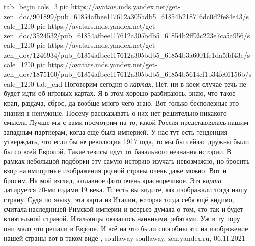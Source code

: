 
\ifcmt
  tab_begin cols=3
     pic https://avatars.mds.yandex.net/get-zen_doc/901899/pub_61854afbee117612a305bdb5_61854b218716dc0d2fe84e43/scale_1200
     pic https://avatars.mds.yandex.net/get-zen_doc/3524532/pub_61854afbee117612a305bdb5_61854b2ff93c223e7ca5a956/scale_1200
		 pic https://avatars.mds.yandex.net/get-zen_doc/1246934/pub_61854afbee117612a305bdb5_61854b3a6001fe1da5fbf43e/scale_1200
		 pic https://avatars.mds.yandex.net/get-zen_doc/1875160/pub_61854afbee117612a305bdb5_61854b5614cf1b34fe06156b/scale_1200
  tab_end
\fi
Поговорим сегодня о \emph{картах}. Нет, ни в коем случае речь не будет идти об
игровых картах. Я в этом хорошо разбираюсь, знаю, что такое крап, раздача,
сброс, да вообще много чего знаю. Вот только бесполезные это знания и ненужные.
Посему рассказывать о них нет решительно никакого смысла. Лучше мы с вами
посмотрим на то, какой Россия представлялась нашим западным партнерам, когда
ещё была империей. У нас тут есть тенденция утверждать, что если бы не
революция 1917 года, то мы бы сейчас дружны были бы со всей Европой. Такие
тезисы идут от банального незнания истории. В рамках небольшой подборки эту
самую историю изучать невозможно, но бросить взор на импортные изображения
родной страны очень даже можно. Вот и бросим.  На мой взгляд, заглавное фото
очень красноречивое. Эта \emph{карта} датируется 70-ми годами 19 века. То есть
вы видите, как изображали тогда нашу страну. Судя по языку, эта карта из
Италии, которая тогда себя ещё видимо, считала наследницей Римской империи и
всерьез думала о том, что так и будет влиятельной страной.  Итальянцы оказались
наивными ребятами. Уж в ту пору они мало что решали в Европе. И всё на что были
способны это на изображение нашей страны вот в таком виде
, 
soullaway soullaway, zen.yandex.ru, 06.11.2021
